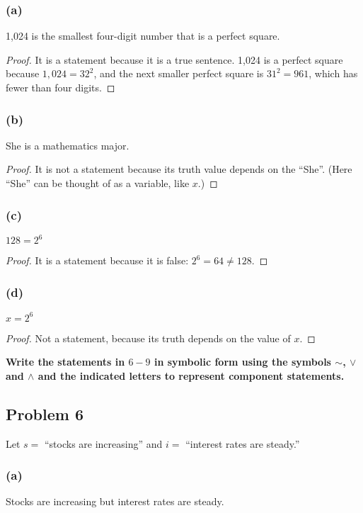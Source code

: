 \documentclass[14pt]{extarticle}
\begin{document}
\subsubsection{(a)}
1,024 is the smallest four-digit number that is a perfect square.

\begin{proof}
It is a statement because it is a true sentence. 1,024 is a perfect square
because $1,024 = 32^2$, and the next smaller perfect square is $31^2 = 961$,
which has fewer than four digits.
\end{proof}

\subsubsection{(b)}
She is a mathematics major.

\begin{proof}
It is not a statement because its truth value depends on the ``She''. (Here
``She'' can be thought of as a variable, like $x$.)
\end{proof}

\subsubsection{(c)}
$128 = 2^6$

\begin{proof}
It is a statement because it is false: $2^6 = 64 \neq 128$.
\end{proof}

\subsubsection{(d)}
$x = 2^6$

\begin{proof}
Not a statement, because its truth depends on the value of $x$.
\end{proof}

{\bf Write the statements in $6-9$ in symbolic form using the symbols $\sim$,
$\vee$ and $\wedge$ and the indicated letters to represent component
statements.}

\subsection{Problem 6}
Let $s =$ “stocks are increasing” and $i =$ “interest rates are steady.”

\subsubsection{(a)}
Stocks are increasing but interest rates are steady.
\end{document}
